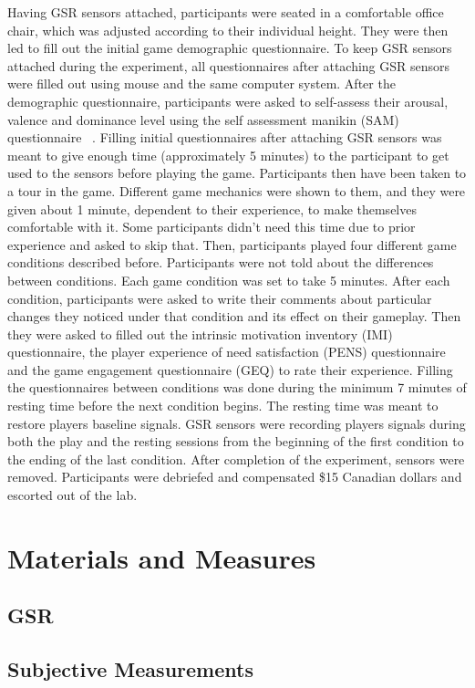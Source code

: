 \documentclass{uofsthesis-cs}
\begin{document}
Having GSR sensors attached, participants were seated in a comfortable office chair, which was adjusted according to their individual height. They were then led to fill out the initial game demographic questionnaire. To keep GSR sensors attached during the experiment, all questionnaires after attaching GSR sensors were filled out using mouse and the same computer system. After the demographic questionnaire, participants were asked to self-assess their arousal, valence and dominance level using the self assessment manikin (SAM) questionnaire ~\cite{?}. Filling initial questionnaires after attaching GSR sensors was meant to give enough time (approximately 5 minutes) to the participant to get used to the sensors before playing the game. Participants then have been taken to a tour in the game. Different game mechanics were shown to them, and they were given about 1 minute, dependent to their experience, to make themselves comfortable with it. Some participants didn't need this time due to prior experience and asked to skip that. Then, participants played four different game conditions described before. Participants were not told about the differences between conditions. Each game condition was set to take 5 minutes. After each condition, participants were asked to write their comments about particular changes they noticed under that condition and its effect on their gameplay. Then they were asked to filled out the intrinsic motivation inventory (IMI) questionnaire, the player experience of need satisfaction (PENS) questionnaire and the game engagement questionnaire (GEQ) to rate their experience. Filling the questionnaires between conditions was done during the minimum 7 minutes of resting time before the next condition begins. The resting time was meant to restore players baseline signals. GSR sensors were recording players signals during both the play and the resting sessions from the beginning of the first condition to the ending of the last condition. After completion of the experiment, sensors were removed. Participants were debriefed and compensated \$15 Canadian dollars and escorted out of the lab.

\section{Materials and Measures}
\subsection{GSR}

\subsection{Subjective Measurements}
\end{document}
